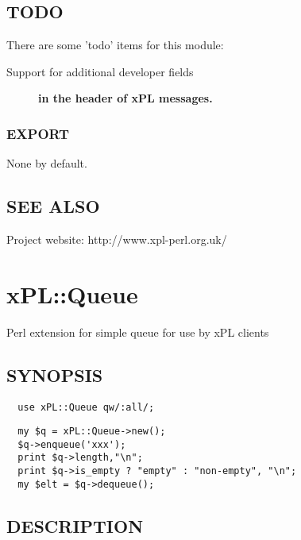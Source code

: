 \subsection*{TODO\label{xPL::Message_TODO}}


There are some 'todo' items for this module:

\begin{description}

\item[{Support for additional developer fields}] \textbf{in the header of xPL messages.}\end{description}
\subsubsection*{EXPORT\label{xPL::Message_EXPORT}}


None by default.

\subsection*{SEE ALSO\label{xPL::Message_SEE_ALSO}}


Project website: http://www.xpl-perl.org.uk/

\section{xPL::Queue\label{xPL::Queue}}


Perl extension for simple queue for use by xPL clients

\subsection*{SYNOPSIS\label{xPL::Queue_SYNOPSIS}}
\begin{verbatim}
  use xPL::Queue qw/:all/;
\end{verbatim}
\begin{verbatim}
  my $q = xPL::Queue->new();
  $q->enqueue('xxx');
  print $q->length,"\n";
  print $q->is_empty ? "empty" : "non-empty", "\n";
  my $elt = $q->dequeue();
\end{verbatim}
\subsection*{DESCRIPTION\label{xPL::Queue_DESCRIPTION}}



